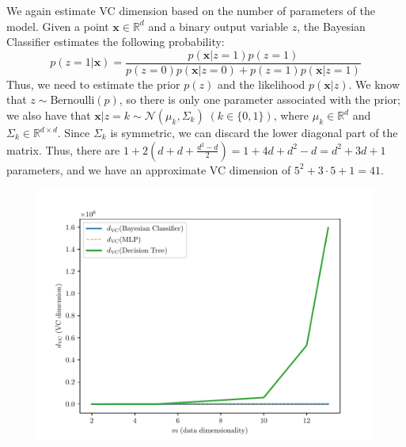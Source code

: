 \documentclass{exam}
\begin{document}
\begin{questions}
\begin{parts}
\begin{subparts}
                \vspace{0.8em}
                \item We again estimate VC dimension based on the number of parameters of the model. Given a point $\textbf{x} \in \mathbb{R}^{d}$ and a binary output variable $z$, the Bayesian Classifier estimates the following probability:
                \vspace{0.4em}
                \[
                    p(z = 1|\textbf{x}) = \frac{p(\textbf{x} | z = 1)p(z = 1)}{p(z = 0)p(\textbf{x} | z = 0) + p(z = 1)p(\textbf{x} | z = 1)}
                \] 
                Thus, we need to estimate the prior $p(z)$ and the likelihood $p(\textbf{x} | z)$. We know that $z \sim \text{Bernoulli}(p)$, so there is only one parameter associated with the prior; we also have that $\textbf{x}|z = k \sim \mathcal{N}(\mu_k, \Sigma_k) \; (k \in \{0,1\})$, where $\mu_k \in \mathbb{R}^{d}$ and $\Sigma_k \in \mathbb{R}^{d \times d}$. Since $\Sigma_k$ is symmetric, we can discard the lower diagonal part of the matrix. Thus, there are $1 + 2(d + d + \frac{d^2 - d}{2}) = 1 + 4d + d^2 - d = d^2 + 3d + 1$ parameters, and we have an approximate VC dimension of $5^2 + 3 \cdot 5 + 1 = 41$.
            \end{subparts}
            \pagebreak
            \item \quad
            \vspace{-3.0em}
            \begin{figure}[H]
                \centering
                \includegraphics[scale = 0.75]{vc_4_a.pdf}
            \end{figure}

\end{parts}
\end{questions}
\end{document}

